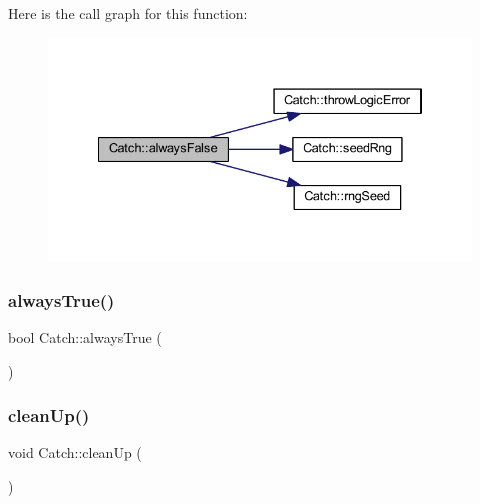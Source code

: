 Here is the call graph for this function\+:\nopagebreak
\begin{figure}[H]
\begin{center}
\leavevmode
\includegraphics[width=334pt]{namespace_catch_ad425271249dd02956a9709e78b8b2783_cgraph}
\end{center}
\end{figure}
\hypertarget{namespace_catch_a129be2186a2f6546206ec52c4bf2156f}{}\label{namespace_catch_a129be2186a2f6546206ec52c4bf2156f} 
\subsubsection{\texorpdfstring{always\+True()}{alwaysTrue()}}
{\footnotesize\ttfamily bool Catch\+::always\+True (\begin{DoxyParamCaption}{ }\end{DoxyParamCaption})\hspace{0.3cm}{\ttfamily [inline]}}

\hypertarget{namespace_catch_a0f78e9afdebc6d4512d18e76fbf54b8c}{}\label{namespace_catch_a0f78e9afdebc6d4512d18e76fbf54b8c} 
\subsubsection{\texorpdfstring{clean\+Up()}{cleanUp()}}
{\footnotesize\ttfamily void Catch\+::clean\+Up (\begin{DoxyParamCaption}{ }\end{DoxyParamCaption})}

\hypertarget{namespace_catch_ae50508f10ffc4ed873a31a4db4caea16}{}\label{namespace_catch_ae50508f10ffc4ed873a31a4db4caea16} 
